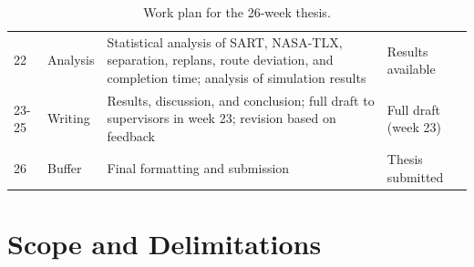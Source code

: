 \documentclass{article}
\begin{document}
\begin{table}[h]
\begin{tabularx}{\textwidth}{@{}l>{\raggedright\arraybackslash}p{2.3cm}>{\raggedright\arraybackslash}X>{\raggedright\arraybackslash}p{3.2cm}@{}}
22 & Analysis & Statistical analysis of SART, NASA-TLX, separation, replans, route deviation, and completion time; analysis of simulation results & Results available \\
23-25 & Writing & Results, discussion, and conclusion; full draft to supervisors in week 23; revision based on feedback & Full draft (week 23) \\
26 & Buffer & Final formatting and submission & Thesis submitted \\
\bottomrule
\end{tabularx}
\caption{Work plan for the 26-week thesis.}
\label{tab:workplan}
\end{table}

\section{Scope and Delimitations}
\end{document}
